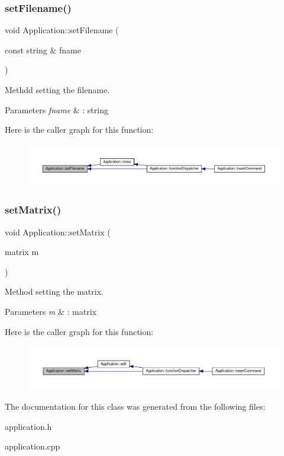 \subsubsection{\texorpdfstring{set\+Filename()}{setFilename()}}
{\footnotesize\ttfamily void Application\+::set\+Filename (\begin{DoxyParamCaption}\item[{const string \&}]{fname }\end{DoxyParamCaption})}

Methdd setting the filename. 
\begin{DoxyParams}{Parameters}
{\em fname} & \+: string \\
\hline
\end{DoxyParams}
Here is the caller graph for this function\+:
\nopagebreak
\begin{figure}[H]
\begin{center}
\leavevmode
\includegraphics[width=350pt]{class_application_a76de879568ee39ac80484441716928d2_icgraph}
\end{center}
\end{figure}
\mbox{\label{class_application_a56b4a55e9eabd40b7f0033ba39631ebe}} 
\subsubsection{\texorpdfstring{set\+Matrix()}{setMatrix()}}
{\footnotesize\ttfamily void Application\+::set\+Matrix (\begin{DoxyParamCaption}\item[{matrix}]{m }\end{DoxyParamCaption})}

Method setting the matrix. 
\begin{DoxyParams}{Parameters}
{\em m} & \+: matrix \\
\hline
\end{DoxyParams}
Here is the caller graph for this function\+:
\nopagebreak
\begin{figure}[H]
\begin{center}
\leavevmode
\includegraphics[width=350pt]{class_application_a56b4a55e9eabd40b7f0033ba39631ebe_icgraph}
\end{center}
\end{figure}


The documentation for this class was generated from the following files\+:\begin{DoxyCompactItemize}
\item 
application.\+h\item 
application.\+cpp\end{DoxyCompactItemize}
